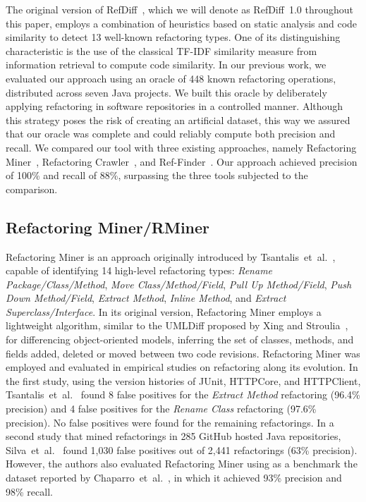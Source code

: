 The original version of RefDiff~\cite{msr2017}, which we will denote as RefDiff~1.0 throughout this paper, employs a combination of heuristics based on static analysis and code similarity to detect 13 well-known refactoring types.
One of its distinguishing characteristic is the use of the classical TF-IDF similarity measure from information retrieval to compute code similarity.
In our previous work, we evaluated our approach using an oracle of 448 known refactoring operations, distributed across seven Java projects.
We built this oracle by deliberately applying refactoring in software repositories in a controlled manner. Although this strategy poses the risk of creating an artificial dataset, this way we assured that our oracle was complete and could reliably compute both precision and recall.
We compared our tool with three existing approaches, namely Refactoring Miner~\cite{tsantalis_empiricalstudy}, Refactoring Crawler~\cite{dig2006automated}, and Ref-Finder~\cite{Kim:2010:RefFinder}.
Our approach achieved precision of 100\% and recall of 88\%, surpassing the three tools subjected to the comparison.


\subsection{Refactoring Miner/RMiner}

Refactoring Miner is an approach originally introduced by Tsantalis~et~al.~\cite{tsantalis_empiricalstudy}, capable of identifying 14 high-level refactoring types: \emph{Rename Package/Class/Method}, \emph{Move Class/Method/Field}, \emph{Pull Up Method/Field}, \emph{Push Down Method/Field}, \emph{Extract Method}, \emph{Inline Method}, and \emph{Extract Superclass/Interface}.
In its original version, Refactoring Miner employs a lightweight algorithm, similar to the UMLDiff proposed by Xing and Stroulia~\cite{Xing:2005}, for differencing object-oriented models, inferring the set of classes, methods, and fields added, deleted or moved between two code revisions. 
Refactoring Miner was employed and evaluated in empirical studies on refactoring along its evolution.
In the first study, using the version histories of JUnit, HTTPCore, and HTTPClient, Tsantalis~et~al.~\cite{tsantalis_empiricalstudy} found 8 false positives for the \emph{Extract Method} refactoring (96.4\% precision) and 4 false positives for the \emph{Rename Class} refactoring (97.6\% precision). No false positives were found for the remaining refactorings.
In a second study that mined refactorings in 285 GitHub hosted Java repositories, Silva~et~al.~\cite{fse2016-why-we-refactor} found 1,030 false positives out of 2,441 refactorings (63\% precision). However, the authors also evaluated Refactoring Miner using as a benchmark the dataset reported by Chaparro~et~al.~\cite{Chaparro:2014}, in which it achieved 93\% precision and 98\% recall.

